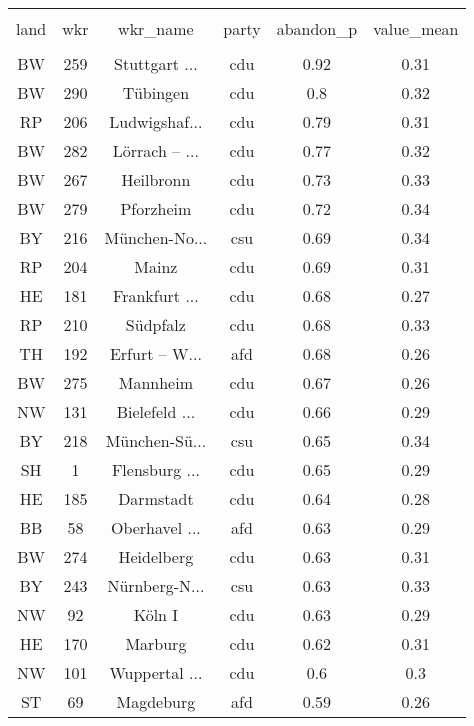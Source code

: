 
\begin{table}[!htbp] \centering 
  \caption{} 
  \label{} 
\begin{tabular}{@{\extracolsep{5pt}} cccccc} 
\\[-1.8ex]\hline 
\hline \\[-1.8ex] 
land & wkr & wkr\_name & party & abandon\_p & value\_mean \\ 
\hline \\[-1.8ex] 
BW & 259 & Stuttgart ... & cdu & 0.92 & 0.31 \\ 
BW & 290 & Tübingen & cdu & 0.8 & 0.32 \\ 
RP & 206 & Ludwigshaf... & cdu & 0.79 & 0.31 \\ 
BW & 282 & Lörrach – ... & cdu & 0.77 & 0.32 \\ 
BW & 267 & Heilbronn & cdu & 0.73 & 0.33 \\ 
BW & 279 & Pforzheim & cdu & 0.72 & 0.34 \\ 
BY & 216 & München-No... & csu & 0.69 & 0.34 \\ 
RP & 204 & Mainz & cdu & 0.69 & 0.31 \\ 
HE & 181 & Frankfurt ... & cdu & 0.68 & 0.27 \\ 
RP & 210 & Südpfalz & cdu & 0.68 & 0.33 \\ 
TH & 192 & Erfurt – W... & afd & 0.68 & 0.26 \\ 
BW & 275 & Mannheim & cdu & 0.67 & 0.26 \\ 
NW & 131 & Bielefeld ... & cdu & 0.66 & 0.29 \\ 
BY & 218 & München-Sü... & csu & 0.65 & 0.34 \\ 
SH & 1 & Flensburg ... & cdu & 0.65 & 0.29 \\ 
HE & 185 & Darmstadt & cdu & 0.64 & 0.28 \\ 
BB & 58 & Oberhavel ... & afd & 0.63 & 0.29 \\ 
BW & 274 & Heidelberg & cdu & 0.63 & 0.31 \\ 
BY & 243 & Nürnberg-N... & csu & 0.63 & 0.33 \\ 
NW & 92 & Köln I & cdu & 0.63 & 0.29 \\ 
HE & 170 & Marburg & cdu & 0.62 & 0.31 \\ 
NW & 101 & Wuppertal ... & cdu & 0.6 & 0.3 \\ 
ST & 69 & Magdeburg & afd & 0.59 & 0.26 \\ 

\end{tabular}
\end{table}
